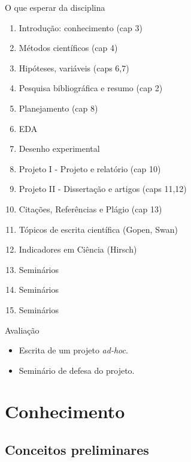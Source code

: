 \documentclass{beamer}
\begin{document}
\begin{frame}{O que esperar da disciplina}
  \begin{enumerate}
  \item<2-> \alert<2>{Introdução: conhecimento} (cap 3)
  \item<2-> \alert<2>{Métodos científicos} (cap 4)
  \item<2-> \alert<2>{Hipóteses, variáveis} (caps 6,7)
  \item<2-> \alert<2>{Pesquisa bibliográfica e resumo} (cap 2)
  \item<3-> \alert<3>{Planejamento} (cap 8)
  \item<3-> \alert<3>{EDA}
  \item<3-> \alert<3>{Desenho experimental}
  \item<4-> \alert<4>{Projeto I - Projeto e relatório} (cap 10)
  \item<4-> \alert<4>{Projeto II - Dissertação e artigos} (caps 11,12)
  \item<4-> \alert<4>{Citações, Referências e Plágio} (cap 13)
  \item<5-> \alert<5>{Tópicos de escrita científica} (Gopen, Swan)
  \item<6-> \alert<6>{Indicadores em Ciência} (Hirsch)
  \item<1-> Seminários
  \item<1-> Seminários
  \item<1-> Seminários
  \end{enumerate}
\end{frame}

\begin{frame}{Avaliação}
  \begin{itemize}
  \item Escrita de um projeto {\em ad-hoc}.
  \item Seminário de defesa do projeto.
  \end{itemize}
\end{frame}

\section{Conhecimento}

\subsection{Conceitos preliminares}

\end{document}
